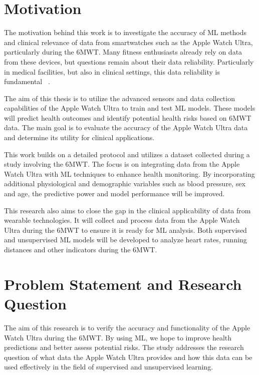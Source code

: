 \section{Motivation}

The motivation behind this work is to investigate the accuracy of ML methods and clinical relevance of data from smartwatches such as the Apple Watch Ultra, particularly during the 6MWT. Many fitness enthusiasts already rely on data from these devices, but questions remain about their data reliability. Particularly in medical facilities, but also in clinical settings, this data reliability is fundamental ~\cite{b58999084d4b43b8bea456c509edf858}.

The aim of this thesis is to utilize the advanced sensors and data collection capabilities of the Apple Watch Ultra to train and test ML models. These models will predict health outcomes and identify potential health risks based on 6MWT data. The main goal is to evaluate the accuracy of the Apple Watch Ultra data and determine its utility for clinical applications.

This work builds on a detailed protocol and utilizes a dataset collected during a study involving the 6MWT. The focus is on integrating data from the Apple Watch Ultra with ML techniques to enhance health monitoring. By incorporating additional physiological and demographic variables such as blood pressure, sex and age, the predictive power and model performance will be improved.

This research also aims to close the gap in the clinical applicability of data from wearable technologies. It will collect and process data from the Apple Watch Ultra during the 6MWT to ensure it is ready for ML analysis. Both supervised and unsupervised ML models will be developed to analyze heart rates, running distances and other indicators during the 6MWT.

\section{Problem Statement and Research Question}

The aim of this research is to verify the accuracy and functionality of the Apple Watch Ultra during the 6MWT. By using ML, we hope to improve health predictions and better assess potential risks. The study addresses the research question of what data the Apple Watch Ultra provides and how this data can be used effectively in the field of supervised and unsupervised learning.

